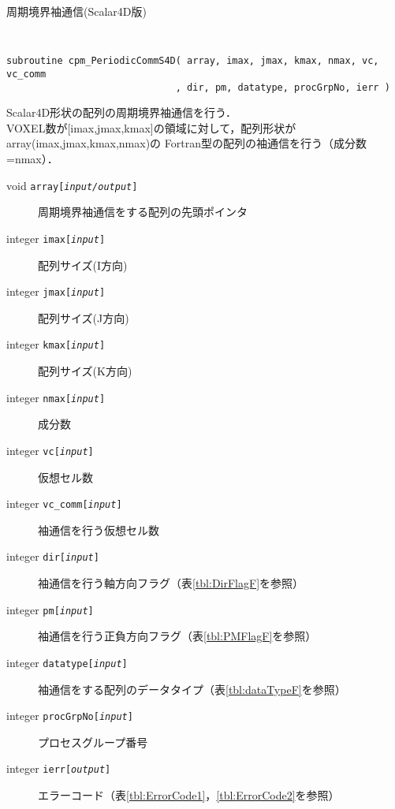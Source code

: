\begin{spacing}{0.8}
\begin{itembox}[l]{周期境界袖通信(Scalar4D版)}
{\tt
\begin{verbatim}
subroutine cpm_PeriodicCommS4D( array, imax, jmax, kmax, nmax, vc, vc_comm
                              , dir, pm, datatype, procGrpNo, ierr )
\end{verbatim}
}
Scalar4D形状の配列の周期境界袖通信を行う．\\
VOXEL数が[imax,jmax,kmax]の領域に対して，配列形状がarray(imax,jmax,kmax,nmax)の
Fortran型の配列の袖通信を行う（成分数=nmax）．
\begin{description}
\item[void    {\tt array[{\it input/output}]}] 周期境界袖通信をする配列の先頭ポインタ
\item[integer {\tt imax[{\it input}]}] 配列サイズ(I方向)
\item[integer {\tt jmax[{\it input}]}] 配列サイズ(J方向)
\item[integer {\tt kmax[{\it input}]}] 配列サイズ(K方向)
\item[integer {\tt nmax[{\it input}]}] 成分数
\item[integer {\tt vc[{\it input}]}] 仮想セル数
\item[integer {\tt vc\_comm[{\it input}]}] 袖通信を行う仮想セル数
\item[integer {\tt dir[{\it input}]}] 袖通信を行う軸方向フラグ（表\ref{tbl:DirFlagF}を参照）
\item[integer {\tt pm[{\it input}]}] 袖通信を行う正負方向フラグ（表\ref{tbl:PMFlagF}を参照）
\item[integer {\tt datatype[{\it input}]}] 袖通信をする配列のデータタイプ（表\ref{tbl:dataTypeF}を参照）
\item[integer {\tt procGrpNo[{\it input}]}] プロセスグループ番号
\item[integer {\tt ierr[{\it output}]}] エラーコード（表\ref{tbl:ErrorCode1}，\ref{tbl:ErrorCode2}を参照）
\end{description}
\end{itembox}\\
\end{spacing}

